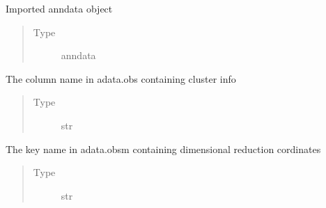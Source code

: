 \documentclass[letterpaper,10pt,english]{sphinxmanual}
\begin{document}
\begin{fulllineitems}
\begin{enumerate}
\end{enumerate}

\begin{fulllineitems}
\label{\detokenize{modules/celloracle:celloracle.Oracle.adata}}
Imported anndata object
\begin{quote}\begin{description}
\item[{Type}] \leavevmode
anndata

\end{description}\end{quote}

\end{fulllineitems}


\begin{fulllineitems}
\label{\detokenize{modules/celloracle:celloracle.Oracle.cluster_column_name}}
The column name in adata.obs containing cluster info
\begin{quote}\begin{description}
\item[{Type}] \leavevmode
str

\end{description}\end{quote}

\end{fulllineitems}


\begin{fulllineitems}
\label{\detokenize{modules/celloracle:celloracle.Oracle.embedding_name}}
The key name in adata.obsm containing dimensional reduction cordinates
\begin{quote}\begin{description}
\item[{Type}] \leavevmode
str

\end{description}\end{quote}


\end{fulllineitems}
\end{fulllineitems}
\end{document}
